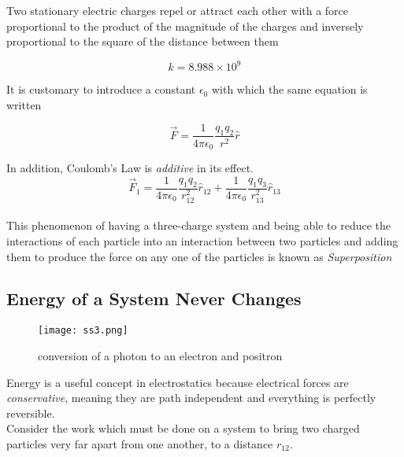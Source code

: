 \documentclass[svgnames]{article}
\begin{document}
Two stationary electric charges repel or attract each other with a force
proportional to the product of the magnitude of the charges and inversely
proportional to the square of the distance between them

\[ k = 8.988 \times 10^9 \] 
 
It is customary to introduce a constant $\epsilon_0$ with which the same equation is written \\ 

\begin{tcolorbox}	

\[ \vec{F} = \frac{1}{4\pi \epsilon_0}\frac{q_1q_2}{r^2}\hat{r} \]

\end{tcolorbox}

In addition, Coulomb's Law is \textit{additive} in its effect. \\

\[ \vec{F}_1 = \frac{1}{4\pi \epsilon_0}\frac{q_1q_2}{r_{12}^2}\hat{r}_{12}
+ \frac{1}{4\pi \epsilon_0}\frac{q_1q_3}{r_{13}^2}\hat{r}_{13} \] \\

This phenomenon of having a three-charge system and being able to reduce the
interactions of each particle into an interaction between two particles and
adding them to produce the force on any one of the particles is known as \textit{Superposition} 

\subsection{Energy of a System Never Changes}

\vspace{20px}

\begin{figure}[!hb]
  \centering
\texttt{[image: ss3.png]}
\caption{conversion of a photon to an electron and positron}
\end{figure}


\vspace{20px}

Energy is a useful concept in electrostatics because electrical forces are
\textit{conservative}, meaning they are path independent and everything is perfectly reversible. \\ 

Consider the work which must be done on a system to bring two charged particles
very far apart from one another, to a distance $r_{12}$. \\
\end{document}

